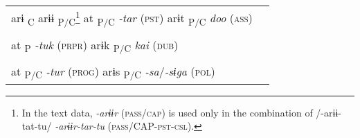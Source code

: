 \begin{table}
\begin{tabular}{ll}
arɨ\textsubscript{ C}  arɨɨ\textsubscript{ P/C}\footnote{In the text data, \textit{-arɨɨr} (\textsc{pass}/\textsc{cap}) is used only in the combination of /-arɨɨ-tat-tu/ \textit{-arɨɨr-tar-tu} (\textsc{pass}/CAP-\textsc{pst}-\textsc{csl}).}  at\textsubscript{ P/C}  \textit{-tar} (\textsc{pst})    arɨt\textsubscript{ P/C}      \textit{doo}  (\textsc{ass})                                                                                                                                                            \\
                                                                                                                                                                                                                                                                                                                                                                                                                                                                                                                                \\
    at\textsubscript{ P}  \textit{-tuk} (\textsc{prpr})    arɨk\textsubscript{ P/C}      \textit{kai}  (\textsc{dub})                                                                                                                                                                                                                                                                                                                                                                                                           \\
                                                                                                                                                                                                                                                                                                                                                                                                                                                                                                                                \\
    at\textsubscript{ P/C}  \textit{-tur} (\textsc{prog})    arɨs\textsubscript{ P/C}      \textit{-sa}/\textit{-sɨga}  (\textsc{pol})                                                                                                                                                                                                                                                                                                                                                                                          \\

\end{tabular}
\end{table}

